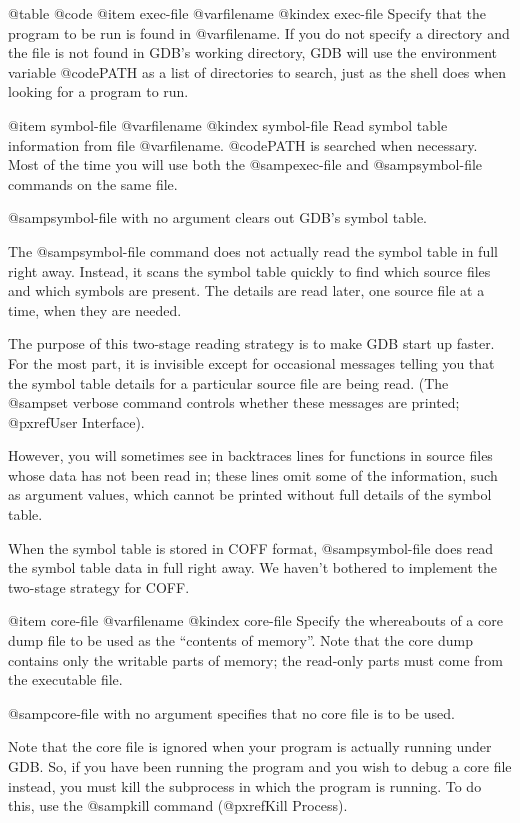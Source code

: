 @table @code
@item exec-file @var{filename}
@kindex exec-file
Specify that the program to be run is found in @var{filename}.  If you
do not specify a directory and the file is not found in GDB's working
directory, GDB will use the environment variable @code{PATH} as a list
of directories to search, just as the shell does when looking for a
program to run.

@item symbol-file @var{filename}
@kindex symbol-file
Read symbol table information from file @var{filename}.  @code{PATH}
is searched when necessary.  Most of the time you will use both the
@samp{exec-file} and @samp{symbol-file} commands on the same file.

@samp{symbol-file} with no argument clears out GDB's symbol table.

The @samp{symbol-file} command does not actually read the symbol table in
full right away.  Instead, it scans the symbol table quickly to find
which source files and which symbols are present.  The details are read
later, one source file at a time, when they are needed.

The purpose of this two-stage reading strategy is to make GDB start up
faster.  For the most part, it is invisible except for occasional
messages telling you that the symbol table details for a particular
source file are being read.  (The @samp{set verbose} command controls
whether these messages are printed; @pxref{User Interface}).

However, you will sometimes see in backtraces lines for functions in
source files whose data has not been read in; these lines omit some of
the information, such as argument values, which cannot be printed
without full details of the symbol table.

When the symbol table is stored in COFF format, @samp{symbol-file} does
read the symbol table data in full right away.  We haven't bothered to
implement the two-stage strategy for COFF.

@item core-file @var{filename}
@kindex core-file
Specify the whereabouts of a core dump file to be used as the
``contents of memory''.  Note that the core dump contains only the
writable parts of memory; the read-only parts must come from the
executable file.

@samp{core-file} with no argument specifies that no core file is
to be used.

Note that the core file is ignored when your program is actually running
under GDB.  So, if you have been running the program and you wish to
debug a core file instead, you must kill the subprocess in which the
program is running.  To do this, use the @samp{kill} command
(@pxref{Kill Process}).

